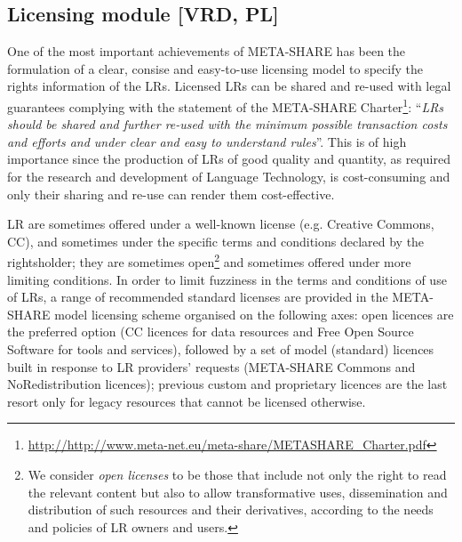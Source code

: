 \documentclass{llncs}
\begin{document}
{\subsection{Licensing module [VRD, PL]}
\label{sec:licensing}
One of the most important achievements of META-SHARE has been the formulation of a clear, consise and easy-to-use licensing model to specify the rights information of the LRs. 
Licensed LRs can be shared and re-used with legal guarantees complying with the statement of the META-SHARE Charter\footnote{\url{http://http://www.meta-net.eu/meta-share/METASHARE\_Charter.pdf}}: ``\textit{LRs should be shared and further re-used with the minimum possible transaction costs and efforts and under clear and easy to understand rules}''. This is of high importance since the production of LRs of good quality and quantity, as required for the research and development of Language Technology, is cost-consuming and only their sharing and re-use can render them cost-effective. 

LR are sometimes offered under a well-known license (e.g. Creative Commons, CC), and sometimes under the specific terms and conditions declared by the rightsholder; they are sometimes open\footnote{We consider \textit{open licenses} to be those that include not only the right to read the relevant content but also to allow transformative uses, dissemination and distribution of such resources and their derivatives, according to the needs and policies of LR owners and users.} and sometimes offered under more limiting conditions.  
In order to limit fuzziness in the terms and conditions of use of LRs, a range of recommended standard licenses are provided in the META-SHARE model licensing scheme organised on the following axes: open licences are the preferred option (CC licences for data resources and Free Open Source Software for tools and services), followed by a set of model (standard) licences built in response to LR providers' requests (META-SHARE Commons and NoRedistribution licences); previous custom and proprietary licences are the last resort only for legacy resources that cannot be licensed otherwise. 


}
\end{document}
